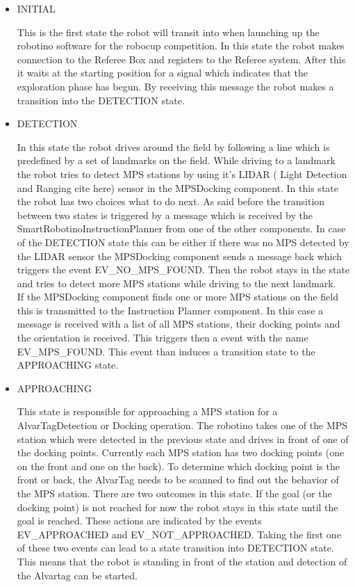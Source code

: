 \begin{itemize}

\item INITIAL 

This is the first state the robot will transit into when launching up the robotino software for the robocup competition. In this state the robot makes connection to the Referee Box and registers to the Referee system. After this it waits at the starting position for a signal which indicates that the exploration phase has begun. By receiving this message the robot makes a transition into the DETECTION state.  


\item DETECTION

In this state the robot drives around the field by following a line which is predefined by a set of landmarks on the field. While driving to a landmark the robot tries to detect MPS stations by using it's LIDAR ( Light Detection and Ranging cite here) sensor in the MPSDocking component. In this state the robot has two choices what to do next. As said before the transition between two states is triggered by a message which is received by the SmartRobotinoInstructionPlanner from one of the other components. In case of the DETECTION state this can be either if there was no MPS detected by the LIDAR sensor the MPSDocking component sends a message back which triggers the event EV\_NO\_MPS\_FOUND. Then the robot stays in the state and tries to detect more MPS stations while driving to the next landmark.  \\

If the MPSDocking component finds one or more MPS stations on the field this is transmitted to the Instruction Planner component. In this case a message is received with a list of all MPS stations, their docking points and the orientation is received. This triggers then a event with the name EV\_MPS\_FOUND. This event than induces a transition state to the APPROACHING state. 

\item APPROACHING 

This state is responsible for approaching a MPS station for a AlvarTagDetection or Docking operation. The robotino takes one of the MPS station which were detected in the previous state and drives in front of one of the docking points. Currently each MPS station has two docking points (one on the front and one on the back). To determine which docking point is the front or back, the AlvarTag needs to be scanned to find out the behavior of the MPS station. There are two outcomes in this state. If the goal (or the docking point) is not reached for now the robot stays in this state until the goal is reached. These actions are indicated by the events EV\_APPROACHED and EV\_NOT\_APPROACHED. Taking the first one of these two events can lead to a state transition into DETECTION state. This means that the robot is standing in front of the station and detection of the Alvartag can be started. 



\end{itemize}
